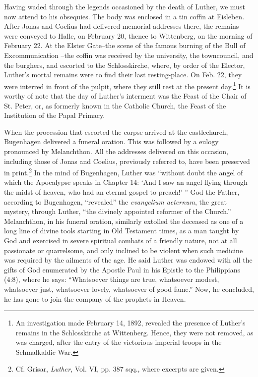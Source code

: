 Having waded through the legends occasioned by the death of
Luther, we must now attend to his obsequies. The body was enclosed
in a tin coffin at Eisleben. After Jonas and Coelius had delivered memorial
addresses there, the remains were conveyed to Halle, on February 20, thence
to Wittenberg, on the morning of February 22. At
the Elster Gate--the scene of the famous burning of the Bull of Excommunication
--the coffin was received by the university, the towncouncil, and the
burghers, and escorted to the Schlosskirche, where, by
order of the Elector, Luther’s mortal remains were to find their last
resting-place. On Feb. 22, they were interred in front of the pulpit,
where they still rest at the present day.\footnote
{An investigation made February 14, 1892, revealed the presence of Luther’s remains
in the Schlosskirche at Wittenberg. Hence, they were not removed, as was charged, after
the entry of the victorious imperial troops in the Schmalkaldic War.}
It is worthy of note that the
day of Luther’s interment was the Feast of the Chair of St. Peter, or,
as formerly known in the Catholic Church, the Feast of the Institution
of the Papal Primacy.

When the procession that escorted the corpse arrived at the castlechurch,
Bugenhagen delivered a funeral oration. This was followed
by a eulogy pronounced by Melanchthon. All the addresses delivered
on this occasion, including those of Jonas and Coelius, previously referred
to, have been preserved in print.\footnote
{Cf. Grisar, \textit{Luther}, Vol. VI, pp. 387 sqq., where excerpts are given.}
In the mind of Bugenhagen,
Luther was “without doubt the angel of which the Apocalypse speaks
in Chapter 14: ‘And I saw an angel flying through the midst of
heaven, who had an eternal gospel to preach!’ ” God the Father, according
to Bugenhagen, “revealed” the \textit{evangelium aeternum}, the
great mystery, through Luther, “the divinely appointed reformer of
the Church.” Melanchthon, in his funeral oration, similarly extolled
the deceased as one of a long line of divine tools starting in Old
Testament times, as a man taught by God and exercised in severe
spiritual combats of a friendly nature, not at all passionate or quarrelsome,
and only inclined to be violent when such medicine was required
by the ailments of the age. He said Luther was endowed with
all the gifts of God enumerated by the Apostle Paul in his Epistle to
the Philippians (4:8), where he says: “Whatsoever things are true,
whatsoever modest, whatsoever just, whatsoever lovely, whatsoever
of good fame.” Now, he concluded, he has gone to join the company
of the prophets in Heaven.

